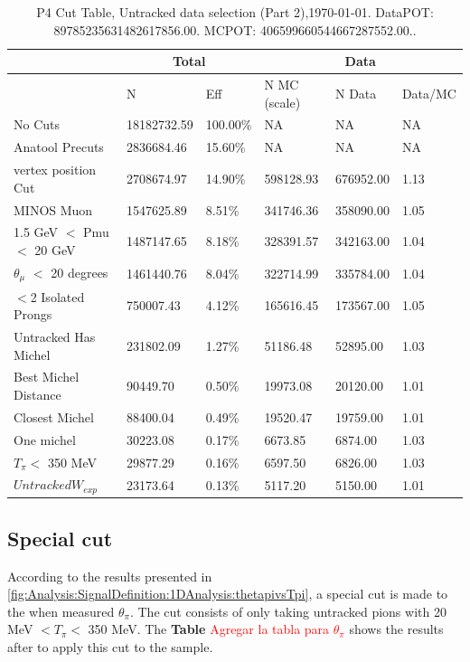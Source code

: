 \begin{table}[!hbt]
    \tiny
    \centering
    \begin{tabular}{|*{6}{l|}}


    \hline
    & \multicolumn{2}{c|}{Total} & \multicolumn{3}{c|}{Data} \\
    \hline
&  N         & Eff     & N MC (scale) & N Data    & Data/MC \\\hline
 No Cuts    & 18182732.59 & 100.00\% & NA & NA & NA \\ \hline
 Anatool Precuts  & 2836684.46 &  15.60\% & NA & NA & NA \\ \hline
 vertex position Cut  & 2708674.97     &  14.90\% & 598128.93     & 676952.00 &   1.13 \\ \hline
 MINOS Muon  & 1547625.89     &   8.51\% & 341746.36     & 358090.00 &   1.05 \\ \hline
 1.5 GeV $<$ Pmu $<$ 20 GeV   & 1487147.65     &   8.18\% & 328391.57     & 342163.00 &   1.04 \\ \hline
 $\theta_{\mu}$ $<$ 20 degrees   & 1461440.76     &   8.04\% & 322714.99     & 335784.00 &   1.04 \\ \hline
 $<$2 Isolated Prongs   & 750007.43     &   4.12\% & 165616.45     & 173567.00 &   1.05 \\ \hline
 Untracked Has Michel   & 231802.09     &   1.27\% & 51186.48     & 52895.00 &   1.03 \\ \hline
 Best Michel Distance   & 90449.70     &   0.50\% & 19973.08     & 20120.00 &   1.01 \\ \hline
 Closest Michel   & 88400.04     &   0.49\% & 19520.47     & 19759.00 &   1.01 \\ \hline
 One michel   & 30223.08     &   0.17\% & 6673.85     & 6874.00 &   1.03 \\ \hline
 $T_\pi<$ 350 MeV   & 29877.29     &   0.16\% & 6597.50     & 6826.00 &   1.03 \\ \hline
 $Untracked W_{exp}$  & 23173.64     &   0.13\% & 5117.20     & 5150.00 &   1.01 \\ \hline
    \end{tabular}
    \caption{P4 Cut Table, Untracked data selection (Part 2),\today. DataPOT: 89785235631482617856.00. MCPOT: 406599660544667287552.00..}
    \label{tab:Analysis:Cuts:UntrackedCutTable2}
\end{table}

\subsection{Special cut}
\label{Cap:Analysis:DataSelection:Cuts:SpecialCut}
According to the results presented in \ref{fig:Analysis:SignalDefinition:1DAnalysis:thetapivsTpi}, a special cut is made to the when measured $\theta_\pi$. The cut consists of only taking untracked pions with 20 MeV $< T_\pi < $ 350 MeV. The \textbf{Table} \textcolor{red}{Agregar la tabla para $\theta_\pi$} shows the results after to apply this cut to the sample.



